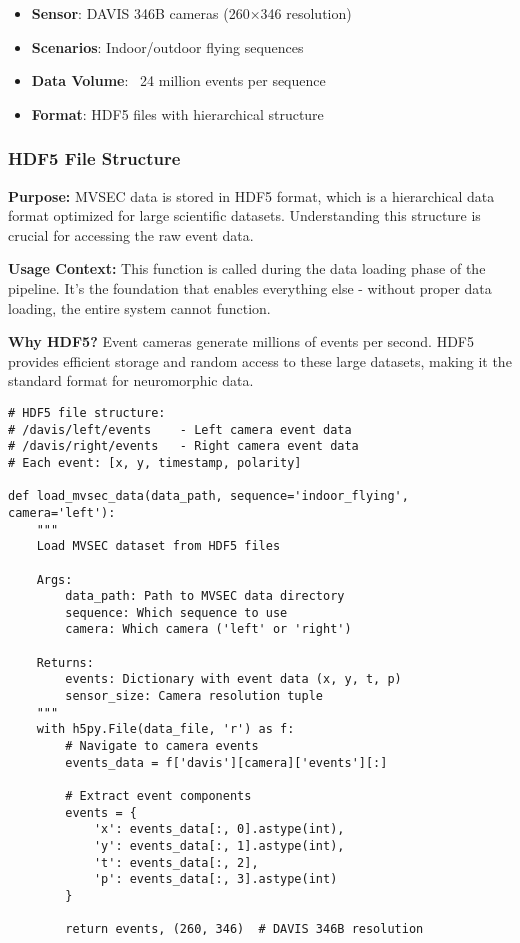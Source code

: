 \documentclass[12pt,a4paper]{article}
\begin{document}
\begin{itemize}
    \item \textbf{Sensor}: DAVIS 346B cameras (260×346 resolution)
    \item \textbf{Scenarios}: Indoor/outdoor flying sequences
    \item \textbf{Data Volume}: ~24 million events per sequence
    \item \textbf{Format}: HDF5 files with hierarchical structure
\end{itemize}

\subsubsection{HDF5 File Structure}

\textbf{Purpose:} MVSEC data is stored in HDF5 format, which is a hierarchical data format optimized for large scientific datasets. Understanding this structure is crucial for accessing the raw event data.

\textbf{Usage Context:} This function is called during the data loading phase of the pipeline. It's the foundation that enables everything else - without proper data loading, the entire system cannot function.

\textbf{Why HDF5?} Event cameras generate millions of events per second. HDF5 provides efficient storage and random access to these large datasets, making it the standard format for neuromorphic data.

\begin{lstlisting}[caption={MVSEC HDF5 File Navigation - Core Data Access Function}]
# HDF5 file structure:
# /davis/left/events    - Left camera event data
# /davis/right/events   - Right camera event data
# Each event: [x, y, timestamp, polarity]

def load_mvsec_data(data_path, sequence='indoor_flying', camera='left'):
    """
    Load MVSEC dataset from HDF5 files

    Args:
        data_path: Path to MVSEC data directory
        sequence: Which sequence to use
        camera: Which camera ('left' or 'right')

    Returns:
        events: Dictionary with event data (x, y, t, p)
        sensor_size: Camera resolution tuple
    """
    with h5py.File(data_file, 'r') as f:
        # Navigate to camera events
        events_data = f['davis'][camera]['events'][:]

        # Extract event components
        events = {
            'x': events_data[:, 0].astype(int),
            'y': events_data[:, 1].astype(int),
            't': events_data[:, 2],
            'p': events_data[:, 3].astype(int)
        }

        return events, (260, 346)  # DAVIS 346B resolution
\end{lstlisting}
\end{document}
